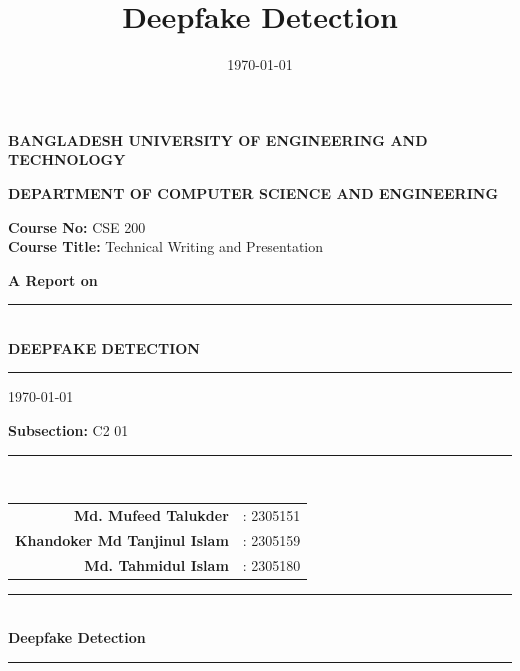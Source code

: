 \documentclass[a4paper,12pt]{article}
\title{Deepfake Detection}
\author{ }
\date{\today}
\begin{document}
\begin{titlepage}
    \begin{center}
        \vspace*{1.2cm}
        {\Large \textbf{BANGLADESH UNIVERSITY OF ENGINEERING AND TECHNOLOGY}}
        
        \vspace{1.0cm}
        {\large \textbf{DEPARTMENT OF COMPUTER SCIENCE AND ENGINEERING}}
        \vspace{1.8cm}
        
        {\large \textbf{Course No:} CSE 200} \\[0.35cm]
        {\large \textbf{Course Title:} Technical Writing and Presentation}

        \vfill
        {\Large \textbf{A Report on}} \\[0.5cm]
        \rule{\linewidth}{0.6mm} \\[0.4cm]
        {\Huge \textbf{DEEPFAKE DETECTION}} \\[0.2cm]
        \rule{\linewidth}{0.6mm}
        \vfill
        {\large \today}
        \vfill
        \begin{minipage}{0.85\textwidth}
            \centering
            {\large \textbf{Subsection:}} C2 \qquad{} 01 \\[0.35cm]
            \rule{0.67\textwidth}{0.3mm} \\[0.5cm]
            
            \begin{tabular}{r l}
                \textbf{Md. Mufeed Talukder}        & : 2305151 \\
                \textbf{Khandoker Md Tanjinul Islam} & : 2305159 \\
                \textbf{Md. Tahmidul Islam}         & : 2305180 \\
            \end{tabular}
        \end{minipage}

        \vspace*{1.5cm}
    \end{center}
\end{titlepage}

\tableofcontents

\newpage

\begin{center}
    \rule{\linewidth}{0.4mm} \\[1em]
    \textbf{\Large Deepfake Detection} \\
    \rule{\linewidth}{0.4mm}
\end{center}
\end{document}
